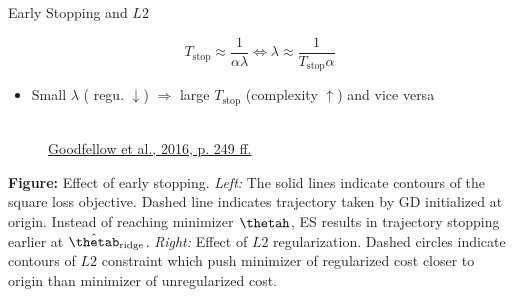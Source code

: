 \begin{vbframe}{Early Stopping and $L2$}
\begin{itemize}
 \end{itemize}
\begin{equation*}
T_{\text{stop}} \approx \frac{1}{\alpha \lambda} 
\Leftrightarrow \lambda \approx \frac{1}{T_{\text{stop}} \alpha}
\end{equation*}
  \begin{itemize}
    \item Small $\lambda$ ( regu. $\downarrow$) $\Rightarrow$ large $T_{\text{stop}}$ (complexity $\uparrow$) and vice versa
  \end{itemize}
\framebreak
  \begin{figure}
    \centering
      \tiny{\\ \href{https://www.deeplearningbook.org/contents/regularization.html}{Goodfellow et al., 2016, p. 249 ff.}\\}
  \end{figure}
  
\footnotesize 
\textbf{Figure:} Effect of early stopping. \textit{Left:} The solid lines indicate contours of the square loss objective. Dashed line indicates trajectory taken by GD initialized at origin. Instead of reaching minimizer $\thetah$, ES results in trajectory stopping earlier at $\hat{\thetab}_{\text{ridge}}$. \textit{Right:} Effect of $L2$ regularization. Dashed circles indicate contours of $L2$ constraint which push minimizer of regularized cost closer to origin than minimizer of unregularized cost.
\end{vbframe}

